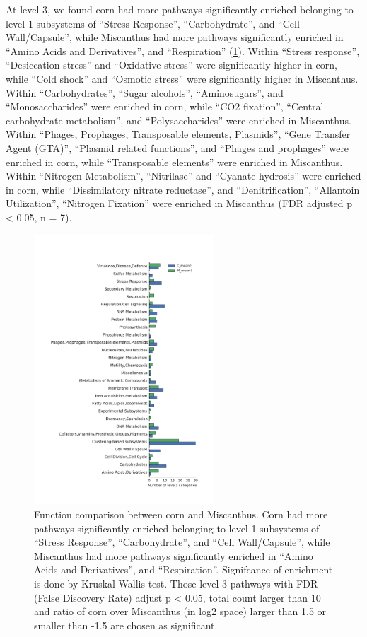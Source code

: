 \documentclass[]{msu-thesis}
\begin{document}
At level 3, we found corn had more pathways significantly enriched belonging to level 1 subsystems of ``Stress Response'', ``Carbohydrate'', and ``Cell Wall/Capsule'', while Miscanthus had more pathways significantly enriched in ``Amino Acids and Derivatives'', and ``Respiration'' (\cref{fig:chap4FigS5}). Within ``Stress response'', ``Desiccation stress'' and ``Oxidative stress'' were significantly higher in corn, while ``Cold shock'' and ``Osmotic stress'' were significantly higher in Miscanthus. Within “Carbohydrates”, “Sugar alcohols”, ``Aminosugars'', and ``Monosaccharides'' were enriched in corn, while ``CO2 fixation'', ``Central carbohydrate metabolism'', and ``Polysaccharides'' were enriched in Miscanthus. Within ``Phages, Prophages, Transposable elements, Plasmids'', ``Gene Transfer Agent (GTA)'', ``Plasmid related functions'', and ``Phages and prophages'' were enriched in corn, while ``Transposable elements'' were enriched in Miscanthus. Within ``Nitrogen Metabolism'', ``Nitrilase'' and ``Cyanate hydrosis'' were enriched in corn, while ``Dissimilatory nitrate reductase'', and ``Denitrification'', ``Allantoin Utilization'', ``Nitrogen Fixation'' were enriched in Miscanthus (FDR adjusted p < 0.05, n = 7).


\begin{figure}[tbph!]
  \centering
  \includegraphics[width=0.60\textwidth]{figs/chap4-subsys-enrich-CvM}
  \caption[Function comparison between corn and Miscanthus]{Function comparison between corn and Miscanthus. Corn had more pathways significantly enriched belonging to level 1 subsystems of ``Stress Response'', ``Carbohydrate'', and ``Cell Wall/Capsule'', while Miscanthus had more pathways significantly enriched in ``Amino Acids and Derivatives'', and ``Respiration''. Signifcance of enrichment is done by Kruskal-Wallis test. Those level 3 pathways with FDR (False Discovery Rate) adjust p < 0.05, total count larger than 10 and ratio of corn over Miscanthus (in log2 space) larger than 1.5  or smaller than -1.5 are chosen as significant.}
  \label{fig:chap4FigS5}
\end{figure}
\end{document}
